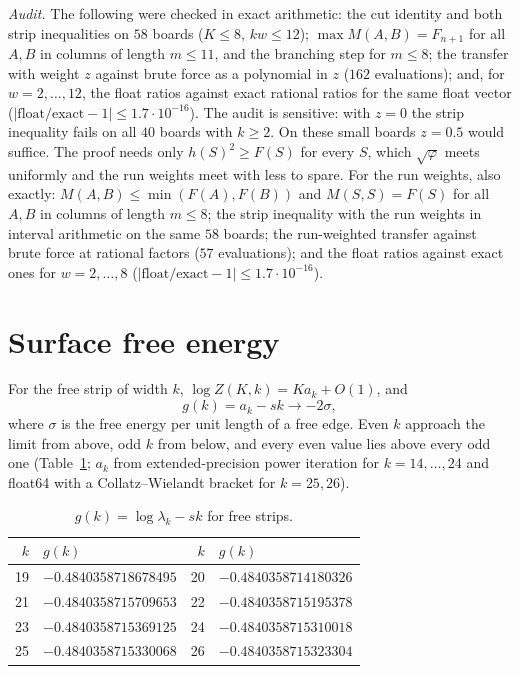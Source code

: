 \documentclass[11pt]{amsart}
\theoremstyle{definition}
\theoremstyle{remark}
\begin{document}
\emph{Audit.} The following were checked in exact arithmetic: the cut identity and both strip
inequalities on $58$ boards ($K \le 8$, $kw \le 12$); $\max M(A, B) = F_{n+1}$ for all $A, B$ in
columns of length $m \le 11$, and the branching step for $m \le 8$; the transfer with weight $z$
against brute force as a polynomial in $z$ ($162$ evaluations); and, for $w = 2, \dots, 12$, the
float ratios against exact rational ratios for the same float vector ($|\text{float}/\text{exact}
- 1| \le 1.7\cdot10^{-16}$). The audit is sensitive: with $z = 0$ the strip inequality fails on all
$40$ boards with $k \ge 2$. On these small boards $z = 0.5$ would suffice. The proof needs only
$h(S)^2 \ge F(S)$ for every $S$, which $\sqrt\varphi$ meets uniformly and the run weights meet with
less to spare. For the run weights, also exactly: $M(A, B) \le
\min(F(A), F(B))$ and $M(S, S) = F(S)$ for all $A, B$ in columns of length $m \le 8$; the strip
inequality with the run weights in interval arithmetic on the same $58$ boards; the run-weighted
transfer against brute force at rational factors ($57$ evaluations); and the float ratios against
exact ones for $w = 2, \dots, 8$ ($|\text{float}/\text{exact} - 1| \le 1.7\cdot10^{-16}$).

\section{Surface free energy}\label{sec:surface}
For the free strip of width $k$, $\log Z(K, k) = K a_k + O(1)$, and
\[
  g(k) = a_k - s k \longrightarrow -2\sigma,
\]
where $\sigma$ is the free energy per unit length of a free edge. Even $k$ approach the limit from
above, odd $k$ from below, and every even value lies above every odd one (Table~\ref{tab:surface};
$a_k$ from extended-precision power iteration for $k = 14, \dots, 24$ and float64 with a
Collatz--Wielandt bracket for $k = 25, 26$).

\begin{table}[ht]
\caption{$g(k) = \log\lambda_k - sk$ for free strips.}\label{tab:surface}
\begin{tabular}{rlrl}
\toprule
$k$ & $g(k)$ & $k$ & $g(k)$ \\
\midrule
19 & $-0.4840358718678495$ & 20 & $-0.4840358714180326$ \\
21 & $-0.4840358715709653$ & 22 & $-0.4840358715195378$ \\
23 & $-0.4840358715369125$ & 24 & $-0.4840358715310018$ \\
25 & $-0.4840358715330068$ & 26 & $-0.4840358715323304$ \\
\bottomrule
\end{tabular}
\end{table}
\end{document}
